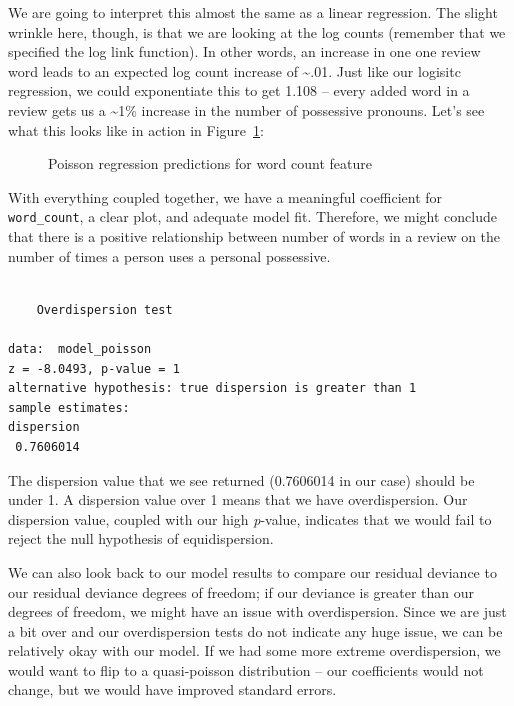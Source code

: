 \documentclass[
  letterpaper,
]{krantz}
\begin{document}
We are going to interpret this almost the same as a linear regression.
The slight wrinkle here, though, is that we are looking at the log
counts (remember that we specified the log link function). In other
words, an increase in one one review word leads to an expected log count
increase of \textasciitilde.01. Just like our logisitc regression, we
could exponentiate this to get 1.108 -- every added word in a review
gets us a \textasciitilde1\% increase in the number of possessive
pronouns. Let's see what this looks like in action in
Figure~\ref{fig-poisson-regression}:

\begin{figure}[H]


\caption{\label{fig-poisson-regression}Poisson regression predictions
for word count feature}

\end{figure}%

With everything coupled together, we have a meaningful coefficient for
\texttt{word\_count}, a clear plot, and adequate model fit. Therefore,
we might conclude that there is a positive relationship between number
of words in a review on the number of times a person uses a personal
possessive.

\begin{verbatim}

    Overdispersion test

data:  model_poisson
z = -8.0493, p-value = 1
alternative hypothesis: true dispersion is greater than 1
sample estimates:
dispersion 
 0.7606014 
\end{verbatim}

The dispersion value that we see returned (0.7606014 in our case) should
be under 1. A dispersion value over 1 means that we have overdispersion.
Our dispersion value, coupled with our high \emph{p}-value, indicates
that we would fail to reject the null hypothesis of equidispersion.

We can also look back to our model results to compare our residual
deviance to our residual deviance degrees of freedom; if our deviance is
greater than our degrees of freedom, we might have an issue with
overdispersion. Since we are just a bit over and our overdispersion
tests do not indicate any huge issue, we can be relatively okay with our
model. If we had some more extreme overdispersion, we would want to flip
to a quasi-poisson distribution -- our coefficients would not change,
but we would have improved standard errors.
\end{document}
